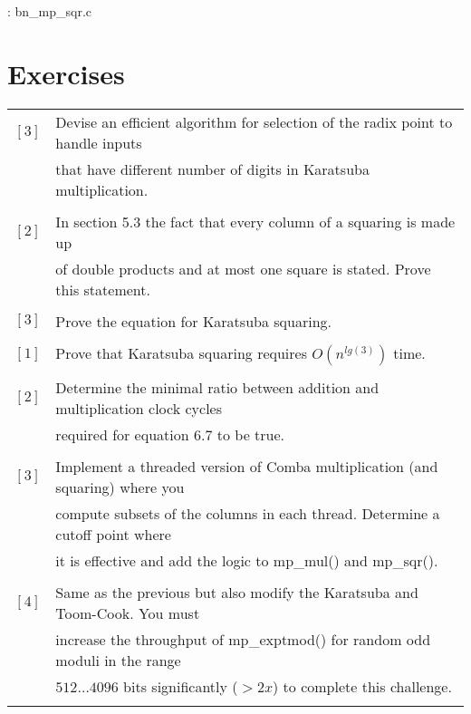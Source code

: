 \documentclass[b5paper]{book}
\begin{document}
\vspace{+3mm}\begin{small}
\hspace{-5.1mm}{\bf File}: bn\_mp\_sqr.c
\vspace{-3mm}
\begin{alltt}
\end{alltt}
\end{small}

\section*{Exercises}
\begin{tabular}{cl}
$\left [ 3 \right ] $ & Devise an efficient algorithm for selection of the radix point to handle inputs \\
                      & that have different number of digits in Karatsuba multiplication. \\
                      & \\
$\left [ 2 \right ] $ & In section 5.3 the fact that every column of a squaring is made up \\
                      & of double products and at most one square is stated.  Prove this statement. \\
                      & \\                      
$\left [ 3 \right ] $ & Prove the equation for Karatsuba squaring. \\
                      & \\
$\left [ 1 \right ] $ & Prove that Karatsuba squaring requires $O \left (n^{lg(3)} \right )$ time. \\
                      & \\ 
$\left [ 2 \right ] $ & Determine the minimal ratio between addition and multiplication clock cycles \\
                      & required for equation $6.7$ to be true.  \\
                      & \\
$\left [ 3 \right ] $ & Implement a threaded version of Comba multiplication (and squaring) where you \\
                      & compute subsets of the columns in each thread.  Determine a cutoff point where \\
                      & it is effective and add the logic to mp\_mul() and mp\_sqr(). \\
                      &\\
$\left [ 4 \right ] $ & Same as the previous but also modify the Karatsuba and Toom-Cook.  You must \\
                      & increase the throughput of mp\_exptmod() for random odd moduli in the range \\
                      & $512 \ldots 4096$ bits significantly ($> 2x$) to complete this challenge. \\
                      & \\
\end{tabular}
\end{document}
